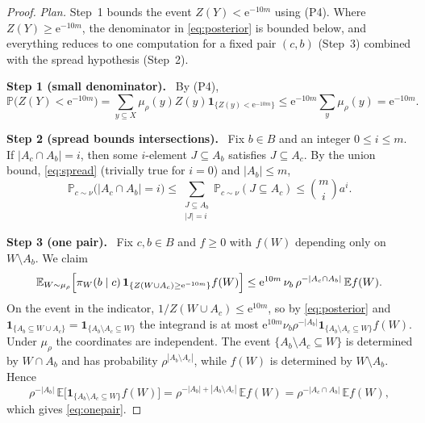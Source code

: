 \documentclass[11pt]{article}
\numberwithin{equation}{section}
\newcommand{\PP}{\mathbb P}
\newcommand{\EE}{\mathbb E}
\newcommand{\ind}{\mathbf 1}
\newcommand{\ee}{\mathrm e}
\newcommand{\step}[2]{\par\medskip\noindent\textbf{Step #1 (#2).}\ }
\begin{document}
\begin{proof}
\emph{Plan.} Step~1 bounds the event $Z(Y)<\ee^{-10m}$ using (P4).
Where $Z(Y)\ge\ee^{-10m}$, the denominator in \eqref{eq:posterior} is
bounded below, and everything reduces to one computation for a fixed
pair $(c,b)$ (Step~3) combined with the spread hypothesis (Step~2).

\step{1}{small denominator}
By (P4),
\begin{equation}\label{eq:small-denominator}
 \PP\bigl(Z(Y)<\ee^{-10m}\bigr)
 =\sum_{y\subseteq X}\mu_\rho(y)Z(y)\ind_{\{Z(y)<\ee^{-10m}\}}
 \le\ee^{-10m}\sum_y\mu_\rho(y)=\ee^{-10m}.
\end{equation}

\step{2}{spread bounds intersections}
Fix $b\in B$ and an integer $0\le i\le m$. If $|A_c\cap A_b|=i$, then
some $i$-element $J\subseteq A_b$ satisfies $J\subseteq A_c$. By the
union bound, \eqref{eq:spread} (trivially true for $i=0$) and
$|A_b|\le m$,
\begin{equation}\label{eq:intersection}
 \PP_{c\sim\nu}\bigl(|A_c\cap A_b|=i\bigr)
 \le\sum_{\substack{J\subseteq A_b\\|J|=i}}
        \PP_{c\sim\nu}(J\subseteq A_c)
 \le\binom mi a^i.
\end{equation}

\step{3}{one pair}
Fix $c,b\in B$ and $f\ge0$ with $f(W)$ depending only on
$W\setminus A_b$. We claim
\begin{equation}\label{eq:onepair}
 \EE_{W\sim\mu_\rho}\Bigl[\pi_W(b\mid c)\,
   \ind_{\{Z(W\cup A_c)\ge\ee^{-10m}\}}f(W)\Bigr]
 \le\ee^{10m}\,\nu_b\,\rho^{-|A_c\cap A_b|}\,\EE f(W).
\end{equation}
On the event in the indicator, $1/Z(W\cup A_c)\le\ee^{10m}$, so by
\eqref{eq:posterior} and
$\ind_{\{A_b\subseteq W\cup A_c\}}=\ind_{\{A_b\setminus A_c\subseteq W\}}$
the integrand is at most
$\ee^{10m}\nu_b\rho^{-|A_b|}\ind_{\{A_b\setminus A_c\subseteq W\}}f(W)$.
Under $\mu_\rho$ the coordinates are independent. The event
$\{A_b\setminus A_c\subseteq W\}$ is determined by $W\cap A_b$ and has
probability $\rho^{|A_b\setminus A_c|}$, while $f(W)$ is determined by
$W\setminus A_b$. Hence
\[
 \rho^{-|A_b|}\,\EE\bigl[\ind_{\{A_b\setminus A_c\subseteq W\}}f(W)\bigr]
 =\rho^{-|A_b|+|A_b\setminus A_c|}\,\EE f(W)
 =\rho^{-|A_c\cap A_b|}\,\EE f(W),
\]
which gives \eqref{eq:onepair}.


\end{proof}
\end{document}
